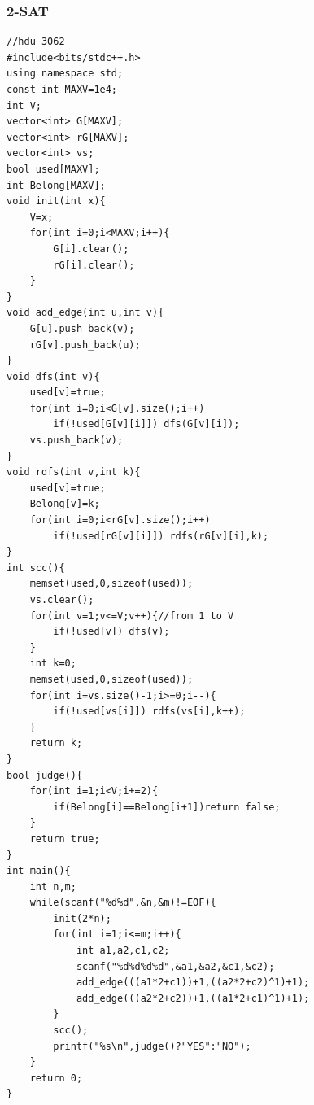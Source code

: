 \documentclass[twoside]{article}
\begin{document}
\subsubsection{2-SAT}
\begin{lstlisting}
//hdu 3062
#include<bits/stdc++.h>
using namespace std;
const int MAXV=1e4;
int V;
vector<int> G[MAXV];
vector<int> rG[MAXV];
vector<int> vs;
bool used[MAXV];
int Belong[MAXV];
void init(int x){
    V=x;
    for(int i=0;i<MAXV;i++){
        G[i].clear();
        rG[i].clear();
    }   
}
void add_edge(int u,int v){
    G[u].push_back(v);
    rG[v].push_back(u);
}
void dfs(int v){
    used[v]=true;
    for(int i=0;i<G[v].size();i++)
        if(!used[G[v][i]]) dfs(G[v][i]);
    vs.push_back(v);
}
void rdfs(int v,int k){
    used[v]=true;
    Belong[v]=k;
    for(int i=0;i<rG[v].size();i++)
        if(!used[rG[v][i]]) rdfs(rG[v][i],k);
}
int scc(){
    memset(used,0,sizeof(used));
    vs.clear();
    for(int v=1;v<=V;v++){//from 1 to V
        if(!used[v]) dfs(v);
    }
    int k=0;
    memset(used,0,sizeof(used));
    for(int i=vs.size()-1;i>=0;i--){
        if(!used[vs[i]]) rdfs(vs[i],k++);
    }
    return k;
}
bool judge(){
    for(int i=1;i<V;i+=2){
        if(Belong[i]==Belong[i+1])return false;
    }
    return true;
}
int main(){
    int n,m;
    while(scanf("%d%d",&n,&m)!=EOF){
        init(2*n);
        for(int i=1;i<=m;i++){
            int a1,a2,c1,c2;
            scanf("%d%d%d%d",&a1,&a2,&c1,&c2);
            add_edge(((a1*2+c1))+1,((a2*2+c2)^1)+1);
            add_edge(((a2*2+c2))+1,((a1*2+c1)^1)+1);
        }
        scc();
        printf("%s\n",judge()?"YES":"NO");   
    }
    return 0;
}
\end{lstlisting}
\end{document}
